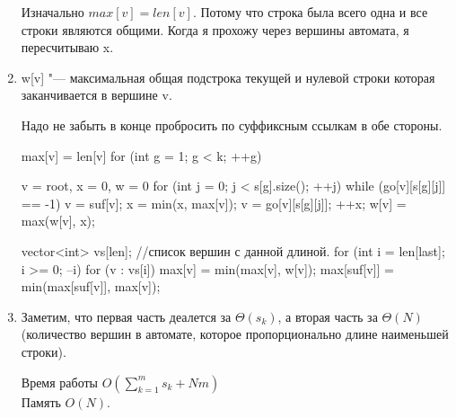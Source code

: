 \begin{enumerate}
    Изначально $max[v] = len[v]$. Потому что строка была всего одна и 
    все строки являются общими. Когда я прохожу через вершины автомата, я пересчитываю x.     
    \item 
    
    w[v] "--- максимальная общая подстрока текущей и нулевой строки которая заканчивается в вершине v. 

    Надо не забыть в конце пробросить по суффиксным ссылкам в обе стороны. 

    \begin{cppcode}
    max[v] = len[v]
    for (int g = 1; g < k; ++g) {
        v = root, x = 0, w = {0}
        for (int j = 0; j < s[g].size(); ++j) {
            while (go[v][s[g][j]] == -1) {
                v = suf[v];
                x = min(x, max[v]);
            }
            v = go[v][s[g][j]];
            ++x;
            w[v] = max(w[v], x);
        }

        vector<int> vs[len]; //список вершин с данной длиной.
        for (int i = len[last]; i >= 0; --i) {
            for (v : vs[i]) {
                max[v] = min(max[v], w[v]);
                max[suf[v]] = min(max[suf[v]], max[v]);
            }
        }
    }
    \end{cppcode}
    
    \item 
    Заметим, что первая часть деалется за $\Theta(s_k)$, 
    а вторая часть за $\Theta(N)$(количество вершин в автомате, которое 
    пропорционально длине наименьшей строки). 

    Время работы $O(\sum_{k = 1}^{m}s_k + Nm)$ \\
    
    Память $O(N)$.
    \end{enumerate}
